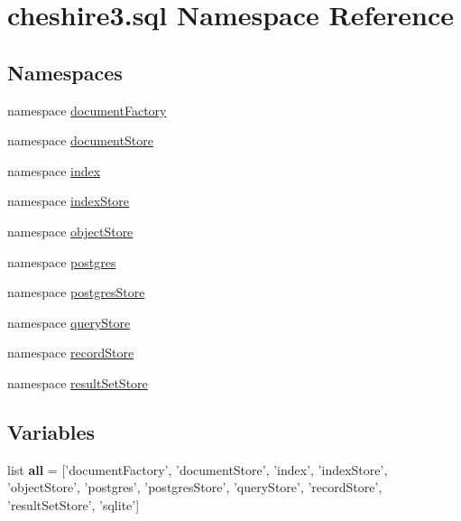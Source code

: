 \hypertarget{namespacecheshire3_1_1sql}{\section{cheshire3.\-sql Namespace Reference}
\label{namespacecheshire3_1_1sql}
}
\subsection*{Namespaces}
\begin{DoxyCompactItemize}
\item 
namespace \hyperlink{namespacecheshire3_1_1sql_1_1document_factory}{document\-Factory}
\item 
namespace \hyperlink{namespacecheshire3_1_1sql_1_1document_store}{document\-Store}
\item 
namespace \hyperlink{namespacecheshire3_1_1sql_1_1index}{index}
\item 
namespace \hyperlink{namespacecheshire3_1_1sql_1_1index_store}{index\-Store}
\item 
namespace \hyperlink{namespacecheshire3_1_1sql_1_1object_store}{object\-Store}
\item 
namespace \hyperlink{namespacecheshire3_1_1sql_1_1postgres}{postgres}
\item 
namespace \hyperlink{namespacecheshire3_1_1sql_1_1postgres_store}{postgres\-Store}
\item 
namespace \hyperlink{namespacecheshire3_1_1sql_1_1query_store}{query\-Store}
\item 
namespace \hyperlink{namespacecheshire3_1_1sql_1_1record_store}{record\-Store}
\item 
namespace \hyperlink{namespacecheshire3_1_1sql_1_1result_set_store}{result\-Set\-Store}
\end{DoxyCompactItemize}
\subsection*{Variables}
\begin{DoxyCompactItemize}
\item 
\hypertarget{namespacecheshire3_1_1sql_aafbe1f390e5e90b3266f3b92bd161311}{list {\bfseries all} = \mbox{[}'document\-Factory', 'document\-Store', 'index', 'index\-Store', 'object\-Store', 'postgres', 'postgres\-Store', 'query\-Store', 'record\-Store', 'result\-Set\-Store', 'sqlite'\mbox{]}}\label{namespacecheshire3_1_1sql_aafbe1f390e5e90b3266f3b92bd161311}

\end{DoxyCompactItemize}



